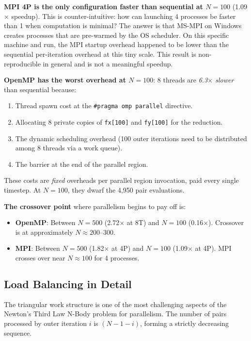 ﻿\documentclass[12pt,a4paper]{article}
\begin{document}
\textbf{MPI 4P is the only configuration faster than sequential at $N=100$}
(1.09$\times$ speedup). This is counter-intuitive: how can launching 4
processes be faster than 1 when computation is minimal? The answer is that
MS-MPI on Windows creates processes that are pre-warmed by the OS scheduler.
On this specific machine and run, the MPI startup overhead happened to be
lower than the sequential per-iteration overhead at this tiny scale. This
result is non-reproducible in general and is not a meaningful speedup.

\textbf{OpenMP has the worst overhead at $N=100$}: 8 threads are
\emph{6.3$\times$ slower} than sequential because:
\begin{enumerate}
    \item Thread spawn cost at the \texttt{\#pragma omp parallel} directive.
    \item Allocating 8 private copies of \texttt{fx[100]} and
          \texttt{fy[100]} for the reduction.
    \item The dynamic scheduling overhead (100 outer iterations need to
          be distributed among 8 threads via a work queue).
    \item The barrier at the end of the parallel region.
\end{enumerate}

These costs are \emph{fixed} overheads per parallel region invocation, paid
every single timestep. At $N=100$, they dwarf the 4,950 pair evaluations.

\textbf{The crossover point} where parallelism begins to pay off is:
\begin{itemize}
    \item \textbf{OpenMP}: Between $N=500$ (2.72$\times$ at 8T) and
          $N=100$ (0.16$\times$). Crossover is at approximately
          $N \approx 200$--$300$.
    \item \textbf{MPI}: Between $N=500$ (1.82$\times$ at 4P) and
          $N=100$ (1.09$\times$ at 4P). MPI crosses over near $N \approx 100$
          for 4 processes.
\end{itemize}

\subsection{Load Balancing in Detail}

The triangular work structure is one of the most challenging aspects of the
Newton's Third Law N-Body problem for parallelism. The number of pairs
processed by outer iteration $i$ is $(N - 1 - i)$, forming a strictly
decreasing sequence.
\end{document}
